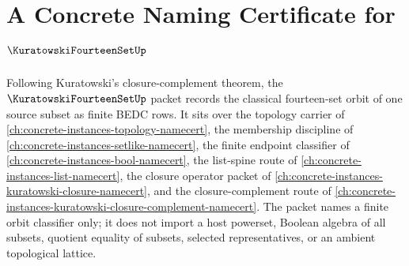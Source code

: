 \chapter{A Concrete Naming Certificate for $\KuratowskiFourteenSetUp$}
\label{ch:concrete-instances-kuratowski-fourteen-set-namecert}

Following Kuratowski's closure-complement theorem, the $\KuratowskiFourteenSetUp$ packet records the classical fourteen-set orbit of one source subset as finite BEDC rows. It sits over the topology carrier of \autoref{ch:concrete-instances-topology-namecert}, the membership discipline of \autoref{ch:concrete-instances-setlike-namecert}, the finite endpoint classifier of \autoref{ch:concrete-instances-bool-namecert}, the list-spine route of \autoref{ch:concrete-instances-list-namecert}, the closure operator packet of \autoref{ch:concrete-instances-kuratowski-closure-namecert}, and the closure-complement route of \autoref{ch:concrete-instances-kuratowski-closure-complement-namecert}. The packet names a finite orbit classifier only; it does not import a host powerset, Boolean algebra of all subsets, quotient equality of subsets, selected representatives, or an ambient topological lattice.

